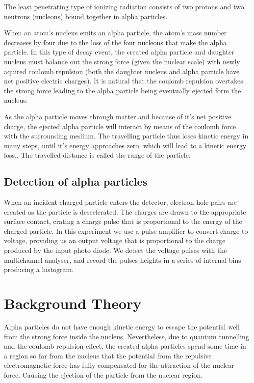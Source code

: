 \documentclass[a4paper]{article}
\begin{document}
\begin{multicols}{2}

The least penetrating type of ionizing radiation consists of two protons and two neutrons (nucleons) bound together in alpha particles.\cite{SPA, alpha}

When an atom's nucleus emits an alpha particle, the atom's mass number decreases by four due to the loss of the four nucleons that make the alpha particle\cite{alpha}. 
In this type of decay event, the created alpha particle and daughter nucleus must balance out the strong force (given the nuclear scale) with newly aquired coulomb repulsion (both the daughter nucleus and alpha particle have net positive electric charges). It is natural that the coulomb repulsion overtakes the strong force leading to the alpha particle being eventually ejected form the nucleus.

As the alpha particle moves through matter and because of it's net positive charge, the ejected alpha particle will interact by means of the coulomb force with the surrounding medium. The travelling particle thus loses kinetic energy in many steps, until it's energy approaches zero.  which will lead to a kinetic energy loss.\cite{SPA}. The travelled distance is called the range of the particle\cite{straggling}.

\subsection{Detection of alpha particles}
When an incident charged particle enters the detector, electron-hole pairs are created as the particle is descelerated. The charges are drawn to the appropriate surface contact, crating a charge pulse that is proportional to the energy of the charged particle.\cite{SPA}
In this experiment we use a pulse amplifier to convert charge-to-voltage, providing us an output voltage that is proportional to the charge produced by the input photo diode\cite{SPA}.
We detect the voltage pulses with the multichannel analyser, and record the pulses heights in a series of internal bins producing a histogram.\cite{SPA}

\section{Background Theory}
Alpha particles do not have enough kinetic energy to escape the potential well from the strong force inside the nucleus. Nevertheless, due to quantum tunnelling and the coulomb repulsion effect, the created alpha particles spend some time in a region so far from the nucleus that the potential from the repulsive electromagnetic force has fully compensated for the attraction of the nuclear force.
Causing the ejection of the particle from the nuclear region\cite{alpha}.  
 

\end{multicols}
\end{document}
